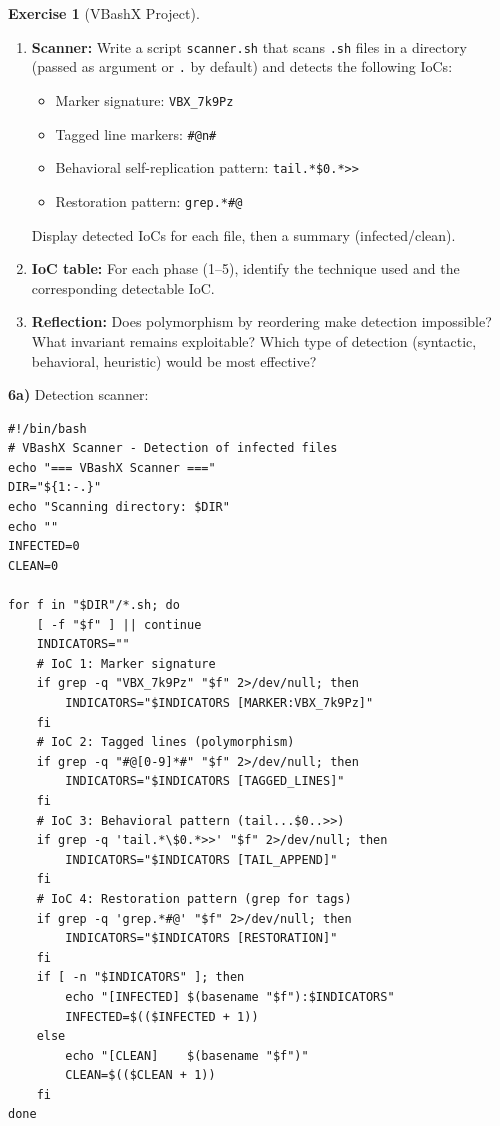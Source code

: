 \documentclass[a4paper,11pt]{article}
\theoremstyle{plain}
\theoremstyle{definition}
\newtheorem{exercice}{Exercise}
\begin{document}
\begin{exercice}[VBashX Project]
\begin{enumerate}
\item[\textbf{6a)}] \textbf{Scanner:} Write a script \texttt{scanner.sh} that scans \texttt{.sh} files in a directory (passed as argument or \texttt{.} by default) and detects the following IoCs:
\begin{itemize}
    \item Marker signature: \texttt{VBX\_7k9Pz}
    \item Tagged line markers: \texttt{\#@n\#}
    \item Behavioral self-replication pattern: \texttt{tail.*\$0.*>>}
    \item Restoration pattern: \texttt{grep.*\#@}
\end{itemize}
Display detected IoCs for each file, then a summary (infected/clean).

\item[\textbf{6b)}] \textbf{IoC table:} For each phase (1--5), identify the technique used and the corresponding detectable IoC.

\item[\textbf{6c)}] \textbf{Reflection:} Does polymorphism by reordering make detection impossible? What invariant remains exploitable? Which type of detection (syntactic, behavioral, heuristic) would be most effective?
\end{enumerate}

\begin{correction}

\textbf{6a)} Detection scanner:
\begin{lstlisting}[title=scanner.sh]
#!/bin/bash
# VBashX Scanner - Detection of infected files
echo "=== VBashX Scanner ==="
DIR="${1:-.}"
echo "Scanning directory: $DIR"
echo ""
INFECTED=0
CLEAN=0

for f in "$DIR"/*.sh; do
    [ -f "$f" ] || continue
    INDICATORS=""
    # IoC 1: Marker signature
    if grep -q "VBX_7k9Pz" "$f" 2>/dev/null; then
        INDICATORS="$INDICATORS [MARKER:VBX_7k9Pz]"
    fi
    # IoC 2: Tagged lines (polymorphism)
    if grep -q "#@[0-9]*#" "$f" 2>/dev/null; then
        INDICATORS="$INDICATORS [TAGGED_LINES]"
    fi
    # IoC 3: Behavioral pattern (tail...$0..>>)
    if grep -q 'tail.*\$0.*>>' "$f" 2>/dev/null; then
        INDICATORS="$INDICATORS [TAIL_APPEND]"
    fi
    # IoC 4: Restoration pattern (grep for tags)
    if grep -q 'grep.*#@' "$f" 2>/dev/null; then
        INDICATORS="$INDICATORS [RESTORATION]"
    fi
    if [ -n "$INDICATORS" ]; then
        echo "[INFECTED] $(basename "$f"):$INDICATORS"
        INFECTED=$(($INFECTED + 1))
    else
        echo "[CLEAN]    $(basename "$f")"
        CLEAN=$(($CLEAN + 1))
    fi
done


\end{lstlisting}
\end{correction}
\end{exercice}
\end{document}
